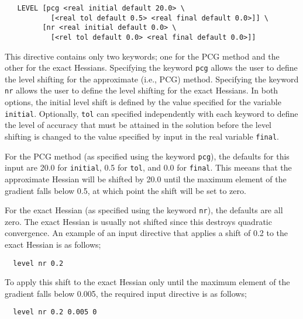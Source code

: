 \begin{verbatim}
   LEVEL [pcg <real initial default 20.0> \
           [<real tol default 0.5> <real final default 0.0>]] \
         [nr <real initial default 0.0> \
           [<rel tol default 0.0> <real final default 0.0>]]
\end{verbatim}


This directive contains only two keywords; one for the PCG method and
the other for the exact Hessians.  Specifying the keyword \verb+pcg+
allows the user to define the level shifting for the approximate
(i.e., PCG) method.  Specifying the keyword \verb+nr+ allows the user
to define the level shifting for the exact Hessians.  In both options,
the initial level shift is defined by the value specified for the
variable \verb+initial+.  Optionally, \verb+tol+ can specified
independently with each keyword to define the level of accuracy that
must be attained in the solution before the level shifting is changed
to the value specified by input in the real variable \verb+final+.

For the PCG method (as specified using the keyword \verb+pcg+), the
defaults for this input are 20.0 for \verb+initial+, 0.5 for
\verb+tol+, and 0.0 for \verb+final+.  This meeans that the
approximate Hessian will be shifted by 20.0 until the maximum element
of the gradient falls below 0.5, at which point the shift will be set
to zero.

For the exact Hessian (as specified using the keyword \verb+nr+), the
defaults are all zero.  The exact Hessian is usually not shifted since
this destroys quadratic convergence.  An example of an input directive
that applies a shift of 0.2 to the exact Hessian is as follows;

\begin{verbatim}
  level nr 0.2
\end{verbatim}

To apply this shift to the exact Hessian only until the maximum
element of the gradient falls below 0.005, the required input
directive is as follows;

\begin{verbatim}
  level nr 0.2 0.005 0
\end{verbatim}

